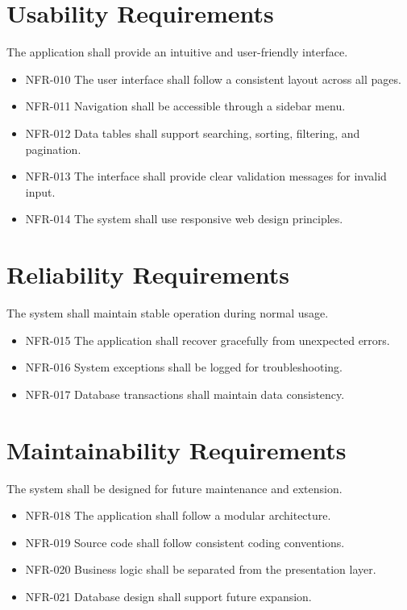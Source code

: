 \section{Usability Requirements}

The application shall provide an intuitive and user-friendly interface.

\begin{itemize}
    \item NFR-010 The user interface shall follow a consistent layout across all pages.
    \item NFR-011 Navigation shall be accessible through a sidebar menu.
    \item NFR-012 Data tables shall support searching, sorting, filtering, and pagination.
    \item NFR-013 The interface shall provide clear validation messages for invalid input.
    \item NFR-014 The system shall use responsive web design principles.
\end{itemize}

\section{Reliability Requirements}

The system shall maintain stable operation during normal usage.

\begin{itemize}
    \item NFR-015 The application shall recover gracefully from unexpected errors.
    \item NFR-016 System exceptions shall be logged for troubleshooting.
    \item NFR-017 Database transactions shall maintain data consistency.
\end{itemize}

\section{Maintainability Requirements}

The system shall be designed for future maintenance and extension.

\begin{itemize}
    \item NFR-018 The application shall follow a modular architecture.
    \item NFR-019 Source code shall follow consistent coding conventions.
    \item NFR-020 Business logic shall be separated from the presentation layer.
    \item NFR-021 Database design shall support future expansion.
\end{itemize}

